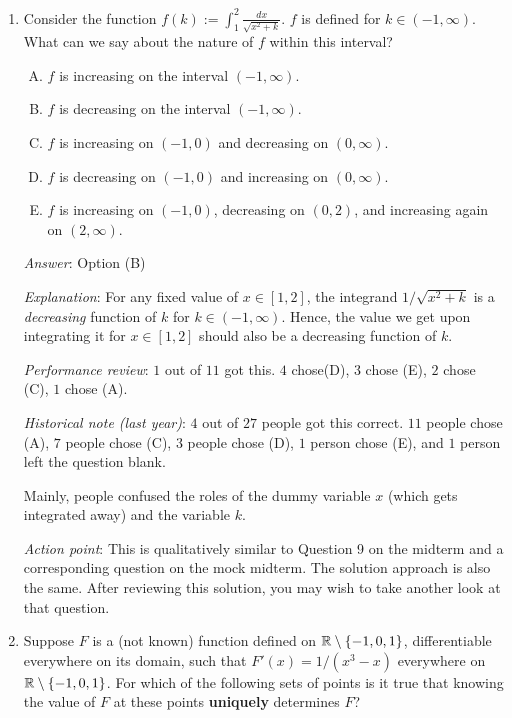 \documentclass[10pt]{amsart}
\begin{document}
\begin{enumerate}
  {\em Historical note (last year)}: $21$ out of $27$ people got this
  correct. $2$ people chose (E), and $1$ person each chose (A), (B),
  and (C). $1$ person left the question blank.

\item Consider the function $f(k) := \int_1^2 \frac{dx}{\sqrt{x^2 +
  k}}$. $f$ is defined for $k \in (-1,\infty)$. What can we say about
  the nature of $f$ within this interval?

  \begin{enumerate}[(A)]
  \item $f$ is increasing on the interval $(-1,\infty)$.
  \item $f$ is decreasing on the interval $(-1,\infty)$.
  \item $f$ is increasing on $(-1,0)$ and decreasing on $(0,\infty)$.
  \item $f$ is decreasing on $(-1,0)$ and increasing on $(0,\infty)$.
  \item $f$ is increasing on $(-1,0)$, decreasing on $(0,2)$, and
    increasing again on $(2,\infty)$.
  \end{enumerate}

  {\em Answer}: Option (B)

  {\em Explanation}: For any fixed value of $x \in [1,2]$, the
  integrand $1/\sqrt{x^2 + k}$ is a {\em decreasing} function of $k$
  for $k \in (-1,\infty)$. Hence, the value we get upon integrating it
  for $x \in [1,2]$ should also be a decreasing function of $k$.

  {\em Performance review}: $1$ out of $11$ got this. $4$ chose(D),
  $3$ chose (E), $2$ chose (C), $1$ chose (A).

  {\em Historical note (last year)}: $4$ out of $27$
  people got this correct. $11$ people chose (A), $7$ people chose
  (C), $3$ people chose (D), $1$ person chose (E), and $1$ person left
  the question blank.

  Mainly, people confused the roles of the dummy variable $x$ (which
  gets integrated away) and the variable $k$.

  {\em Action point}: This is qualitatively similar to Question 9 on
  the midterm and a corresponding question on the mock midterm. The
  solution approach is also the same. After reviewing this solution,
  you may wish to take another look at that question.

\item Suppose $F$ is a (not known) function defined on $\mathbb{R} \setminus
  \{ -1,0,1\}$, differentiable everywhere on its domain, such that
  $F'(x) = 1/(x^3 - x)$ everywhere on $\mathbb{R} \setminus \{-1,0,1\}$. For
  which of the following sets of points is it true that knowing the
  value of $F$ at these points {\bf uniquely} determines $F$?


\end{enumerate}
\end{document}
